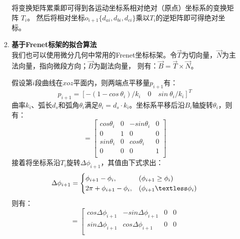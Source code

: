 \begin{itemize}
\begin{enumerate}[label=(\Alph*)]
        将变换矩阵累乘即可得到各运动坐标系相对绝对（原点）坐标系的变换矩阵 $T_i$。
        然后将相对坐标$o_{i+1} \{d_{ai}, d_{bi}, d_{ci}\}$乘以$T_i$的逆矩阵即可得绝对坐标。

        \item \textbf{基于Frenet标架的拟合算法} \\
        我们也可以使用微分几何中常用的Frenet坐标标架\cite{用于光纤光栅曲线重建算法的坐标点拟合}。令$\vec T$为切向量，$\vec N$为主法向量，指向微段方向；$\vec B$为副法向量，
        则有：$\vec B = \vec T \times \vec N$。

        假设第$i$段曲线在$xoz$平面内，则两端点平移量$p_{i+1}$有：
        \begin{equation}
            p_{i+1} = [-(1-cos \ \theta_i)/k_i \quad 0 \quad sin \ \theta_i/k_i]^T
        \end{equation}
        曲率$k_i$、弧长$d_s$和弧角$\theta_i$满足$\theta_i = d_s \cdot k_i$。坐标系平移后沿$B_i$轴旋转$\theta_i$，则有：
        \begin{equation}
        [T_{B_i} ^ {\theta_i}] = \left[
            \begin{matrix}
            cos \theta_i & 0 & -sin \theta_i & 0 \\
            0 &1 & 0 & 0 \\
            sin \theta_i & 0 & cos \theta_i & 0 \\
            0 & 0 & 0 & 1 \\
            \end{matrix}
        \right]
        \end{equation}
        接着将坐标系沿$T_i$旋转$\Delta \phi_{i+1}$，其值由下式求出：
        \begin{equation}
        \Delta \phi_{i+1} = \begin{cases}
            \phi_{i+1} - \phi_i,&(\phi_{i+1} \ge \phi_i) \\
            2\pi + \phi_{i+1} - \phi_i,&(\phi_{i+1} \textless \phi_i)\\
        \end{cases}
        \end{equation}
        则有：
        \begin{equation}
        [T_{T_i} ^ {\Delta\phi_{i+1}}] = \left[
            \begin{matrix}
            cos \Delta\phi_{i+1} & -sin \Delta\phi_{i+1} & 0 & 0 \\
            sin \Delta\phi_{i+1} & cos \Delta\phi_{i+1} & 0 & 0 \\

\end{matrix}
\end{equation}
\end{enumerate}
\end{itemize}
